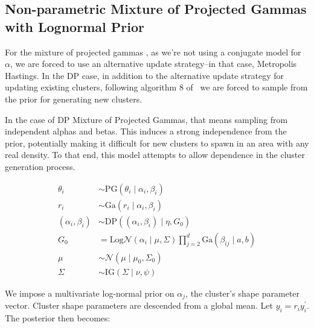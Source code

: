 
\subsection{Non-parametric Mixture of Projected Gammas with Lognormal Prior}
\label{method:npprobitnorm}

For the mixture of projected gammas , as we're not using a conjugate model for $\alpha$, we are
  forced to use an alternative update strategy--in that case, Metropolis Hastings. In the DP case,
  in addition to the alternative update strategy for updating existing clusters, following algorithm
  8 of~\cite{neal2000} we are forced to sample from the prior for generating new clusters.

In the case of DP Mixture of Projected Gammas, that means sampling from independent alphas and betas.
  This induces a strong independence from the prior, potentially making it difficult for new
  clusters to spawn in an area with any real density.  To that end, this model attempts to allow
  dependence in the cluster generation process.

\begin{equation}
  \begin{aligned}
    \theta_i &\sim \text{PG}(\theta_i\mid \alpha_i,\beta_i)\\
    r_i &\sim \text{Ga}(r_i\mid \alpha_i,\beta_i)\\
    (\alpha_i,\beta_i) &\sim \text{DP}\left((\alpha_i,\beta_i)\mid \eta, G_0\right)\\
    G_0 &= \text{Log}\mathcal{N}(\alpha_i\mid\mu,\Sigma)\prod_{j = 2}^d\text{Ga}(\beta_{ij}\mid a, b)\\
    \mu &\sim \mathcal{N}(\mu\mid\mu_0,\Sigma_0)\\
    \Sigma &\sim \text{IG}(\Sigma\mid\nu,\psi)
  \end{aligned}
\end{equation}

We impose a multivariate log-normal prior on $\alpha_j$, the cluster's shape parameter vector.
  Cluster shape parameters are descended from a global mean.  Let $y_i = r_iy_i^{\prime}$.  The
  posterior then becomes:

